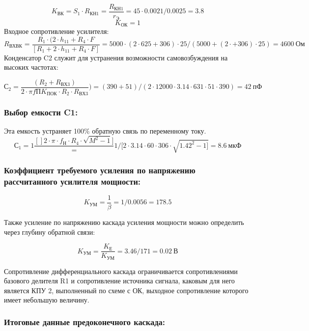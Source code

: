 \begin{equation}
\label{eq:equation4_17}
K_{\text{ВК}}=S_{\text{1}} \cdot R_{\text{КН1}}=\dfrac{R_{\text{КН1}}}{r_{\text{Э}}}=45 \cdot 0.0021/0.0025=3.8

\end{equation}
\begin{equation}
\label{eq:equation4_18}
K_{\text{ОК}}=1
\end{equation}
Входное сопротивление усилителя:
\begin{equation}
\label{eq:equation4_18}
R_{\text{ВХВК}}=\dfrac{R_{\text{1}} \cdot (2 \cdot h_{\text{11}}+R_{\text{4}} \cdot F}{[R_{\text{1}}+2 \cdot h_{\text{11}}+R_{\text{4}} \cdot F]}=5000 \cdot(2 \cdot 625+306) \cdot 25 / (5000+(2 \cdot+306) \cdot 25)=4600~Ом
\end{equation}
Конденсатор C2 служит для устранения возможности самовозбуждения на высоких частотах:

\begin{equation}
\label{eq:equation4_19}
С_{\text{2}}=\dfrac{(R_{\text{2}}+R_{\text{ВХ3}})}{2 \cdot \pi f{\text{П}} K_{\text{ПОК}} \cdot R_{\text{2}} \cdot R_{ВХ3} })=(390+51)
/(2 \cdot 12000 \cdot 3.14 \cdot 631 \cdot 51 \cdot 390)=42~пФ 


\end{equation}
\subsubsection{	Выбор емкости C1:}
Эта емкость устраняет 100\% обратную связь по переменному току.
\begin{equation}
\label{eq:equation4_19}
С_{\text{1}}=1 \dfrac{[]2 \cdot \pi\cdot f_{\text{Н}}\cdot R_{\text{4}}\cdot \sqrt{M^2-1}]}=1/[2 \cdot 3.14 \cdot 60 \cdot 306 \cdot \sqrt{1.42^2-1]}=8.6~{мкФ}
\end{equation}
\subsubsection{	Коэффициент требуемого усиления по напряжению рассчитанного усилителя мощности:}

\begin{equation}
\label{eq:equation4_}
K_{\text{УМ}}=\dfrac{1}{\beta}=1/0.0056=178.5


\end{equation}

Также усиление по напряжению каскада усиления мощности можно определить через глубину обратной связи:

\begin{equation}
\label{eq:equation4_19}
K_{\text{УМ}}=\dfrac {K_{\text{Е}}}{K_{\text{УМ}}}=3.46/171=0.02~В


\end{equation}

Сопротивление дифференциального каскада ограничивается сопротивлениями базового делителя R1 и сопротивление источника сигнала, каковым для него является КПУ 2, выполненный по схеме с ОК, выходное сопротивление которого имеет небольшую величину.
\subsubsection{	Итоговые данные предоконечного каскада:	}
